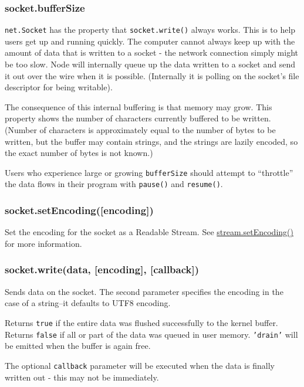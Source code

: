\subsubsection{socket.bufferSize}

\texttt{net.Socket} has the property that \texttt{socket.write()} always
works. This is to help users get up and running quickly. The computer
cannot always keep up with the amount of data that is written to a
socket - the network connection simply might be too slow. Node will
internally queue up the data written to a socket and send it out over
the wire when it is possible. (Internally it is polling on the socket's
file descriptor for being writable).

The consequence of this internal buffering is that memory may grow. This
property shows the number of characters currently buffered to be
written. (Number of characters is approximately equal to the number of
bytes to be written, but the buffer may contain strings, and the strings
are lazily encoded, so the exact number of bytes is not known.)

Users who experience large or growing \texttt{bufferSize} should attempt
to ``throttle'' the data flows in their program with \texttt{pause()}
and \texttt{resume()}.

\subsubsection{socket.setEncoding({[}encoding{]})}

Set the encoding for the socket as a Readable Stream. See
\href{stream.html\#stream\_stream\_setencoding\_encoding}{stream.setEncoding()}
for more information.

\subsubsection{socket.write(data, {[}encoding{]}, {[}callback{]})}

Sends data on the socket. The second parameter specifies the encoding in
the case of a string--it defaults to UTF8 encoding.

Returns \texttt{true} if the entire data was flushed successfully to the
kernel buffer. Returns \texttt{false} if all or part of the data was
queued in user memory. \texttt{'drain'} will be emitted when the buffer
is again free.

The optional \texttt{callback} parameter will be executed when the data
is finally written out - this may not be immediately.

